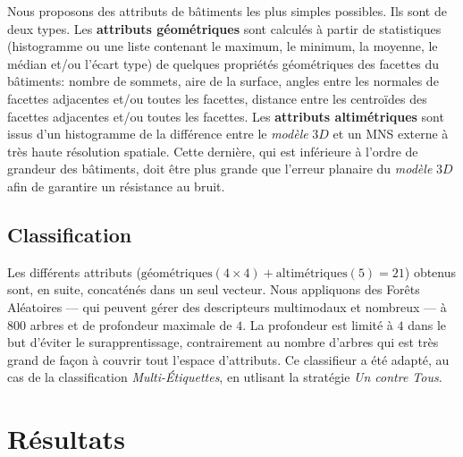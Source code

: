 \documentclass[a4paper,french]{article}
\begin{document}
    Nous proposons des attributs de bâtiments les plus simples possibles. Ils sont de deux types. Les \textbf{attributs géométriques} sont calculés à partir de statistiques (histogramme ou une liste contenant le maximum, le minimum, la moyenne, le médian et/ou l'écart type) de quelques propriétés géométriques des facettes du bâtiments: nombre de sommets, aire de la surface, angles entre les normales de facettes adjacentes et/ou toutes les facettes, distance entre les centroïdes des facettes adjacentes et/ou toutes les facettes. Les \textbf{attributs altimétriques} sont issus d'un histogramme de la différence entre le \emph{modèle} $3D$ et un MNS externe à très haute résolution spatiale. {\color{red}Cette dernière, qui est inférieure à l'ordre de grandeur des bâtiments, doit être plus grande que l'erreur planaire du \emph{modèle} $3D$ afin de garantire un résistance au bruit.}
    \subsection{Classification}

    Les différents attributs ($\text{géométriques}(4\times4) + \text{altimétriques}(5) = 21$) obtenus sont, en suite, concaténés dans un seul vecteur. Nous appliquons des Forêts Aléatoires --- qui peuvent gérer des descripteurs multimodaux et nombreux --- à $800$ arbres et de profondeur maximale de $4$. {\color{red}La profondeur est limité à $4$ dans le but d'éviter le surapprentissage, contrairement au nombre d'arbres qui est très grand de façon à couvrir tout l'espace d'attributs}. Ce classifieur a été adapté, au cas de la classification \emph{Multi-\'Etiquettes}, en utlisant la stratégie \emph{Un contre Tous}.

    \section{Résultats}
\end{document}
